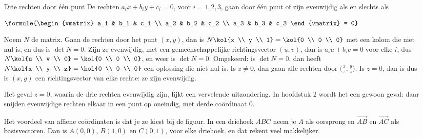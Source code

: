 \begin{theorie}
\begin{stelling}{Drie rechten door één punt}
De rechten $a_ix + b_iy + c_i = 0$, voor $i = 1, 2, 3$, gaan door één punt of zijn evenwijdig als en slechts als

\vspace{1mm}
\qquad $\formule{\begin{vmatrix} a_1 & b_1 & c_1 \\ a_2 & b_2 & c_2 \\ a_3 & b_3 & c_3 \end{vmatrix} = 0}$
\end{stelling}

\begin{bewijs}
Noem $N$ de matrix. Gaan de rechten door het punt $(x, y)$, dan is $N\kol{x \\ y \\ 1} = \kol{0 \\ 0 \\ 0}$ met een kolom die niet nul is, en dus is $\det N = 0$. Zijn ze evenwijdig, met een gemeenschappelijke richtingsvector $(u, v)$, dan is $a_iu + b_iv = 0$ voor elke $i$, dus $N\kol{u \\ v \\ 0} = \kol{0 \\ 0 \\ 0}$, en weer is $\det N = 0$. Omgekeerd: is $\det N = 0$, dan heeft $N\kol{x \\ y \\ z} = \kol{0 \\ 0 \\ 0}$ een oplossing die niet nul is.
Is $z \neq 0$, dan gaan alle rechten door $\bigl(\tfrac xz, \tfrac yz\bigr)$. Is $z = 0$, dan is
dus is $(x, y)$ een richtingsvector van elke rechte: ze zijn evenwijdig.
\end{bewijs}
\end{theorie}

Het geval $z = 0$, waarin de drie rechten evenwijdig zijn, lijkt een vervelende uitzondering. In hoofdstuk 2 wordt het een gewoon geval: daar snijden evenwijdige rechten elkaar in een punt op oneindig, met derde coördinaat 0.

Het voordeel van affiene coördinaten is dat je ze kiest bij de figuur. In een driehoek $ABC$ neem je $A$ als oorsprong en $\vec{AB}$ en $\vec{AC}$ als basisvectoren. Dan is $A(0, 0)$, $B(1, 0)$ en $C(0, 1)$, voor elke driehoek, en dat rekent veel makkelijker.

